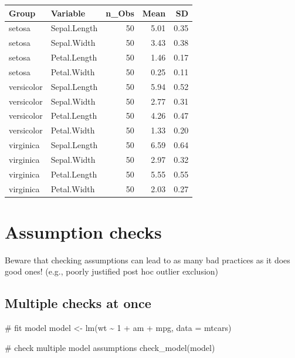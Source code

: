 \documentclass[
  letterpaper,
  DIV=11,
  numbers=noendperiod]{scrreprt}
\newenvironment{Shaded}{\begin{snugshade}}{\end{snugshade}}
\newcommand{\AttributeTok}[1]{\textcolor[rgb]{0.40,0.45,0.13}{#1}}
\newcommand{\CommentTok}[1]{\textcolor[rgb]{0.37,0.37,0.37}{#1}}
\newcommand{\DecValTok}[1]{\textcolor[rgb]{0.68,0.00,0.00}{#1}}
\newcommand{\FunctionTok}[1]{\textcolor[rgb]{0.28,0.35,0.67}{#1}}
\newcommand{\NormalTok}[1]{\textcolor[rgb]{0.00,0.23,0.31}{#1}}
\newcommand{\OtherTok}[1]{\textcolor[rgb]{0.00,0.23,0.31}{#1}}
\newcommand{\SpecialCharTok}[1]{\textcolor[rgb]{0.37,0.37,0.37}{#1}}
\begin{document}
\begin{longtable*}[t]{llrrr}
\toprule
Group & Variable & n\_Obs & Mean & SD\\
\midrule
setosa & Sepal.Length & 50 & 5.01 & 0.35\\
setosa & Sepal.Width & 50 & 3.43 & 0.38\\
setosa & Petal.Length & 50 & 1.46 & 0.17\\
setosa & Petal.Width & 50 & 0.25 & 0.11\\
versicolor & Sepal.Length & 50 & 5.94 & 0.52\\
\addlinespace
versicolor & Sepal.Width & 50 & 2.77 & 0.31\\
versicolor & Petal.Length & 50 & 4.26 & 0.47\\
versicolor & Petal.Width & 50 & 1.33 & 0.20\\
virginica & Sepal.Length & 50 & 6.59 & 0.64\\
virginica & Sepal.Width & 50 & 2.97 & 0.32\\
\addlinespace
virginica & Petal.Length & 50 & 5.55 & 0.55\\
virginica & Petal.Width & 50 & 2.03 & 0.27\\
\bottomrule
\end{longtable*}

\section{Assumption checks}\label{assumption-checks}

Beware that checking assumptions can lead to as many bad practices as it
does good ones! (e.g., poorly justified post hoc outlier exclusion)

\subsection{Multiple checks at once}\label{multiple-checks-at-once}

\begin{Shaded}
\begin{Highlighting}[]
\CommentTok{\# fit model}
\NormalTok{model }\OtherTok{\textless{}{-}} \FunctionTok{lm}\NormalTok{(wt }\SpecialCharTok{\textasciitilde{}} \DecValTok{1} \SpecialCharTok{+}\NormalTok{ am }\SpecialCharTok{+}\NormalTok{ mpg, }\AttributeTok{data =}\NormalTok{ mtcars)}

\CommentTok{\# check multiple model assumptions}
\FunctionTok{check\_model}\NormalTok{(model)}
\end{Highlighting}
\end{Shaded}
\end{document}
